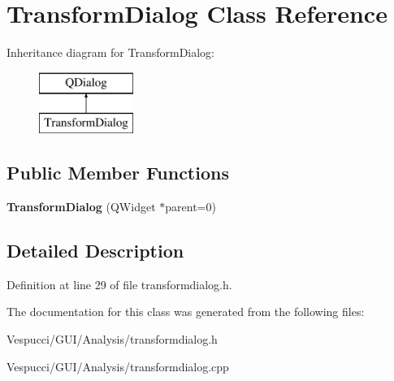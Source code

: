 \hypertarget{class_transform_dialog}{}\section{Transform\+Dialog Class Reference}
\label{class_transform_dialog}
Inheritance diagram for Transform\+Dialog\+:\begin{figure}[H]
\begin{center}
\leavevmode
\includegraphics[height=2.000000cm]{class_transform_dialog}
\end{center}
\end{figure}
\subsection*{Public Member Functions}
\begin{DoxyCompactItemize}
\item 
{\bfseries Transform\+Dialog} (Q\+Widget $\ast$parent=0)\hypertarget{class_transform_dialog_a56f845497971f9f8d21ff7aafbc53596}{}\label{class_transform_dialog_a56f845497971f9f8d21ff7aafbc53596}

\end{DoxyCompactItemize}


\subsection{Detailed Description}


Definition at line 29 of file transformdialog.\+h.



The documentation for this class was generated from the following files\+:\begin{DoxyCompactItemize}
\item 
Vespucci/\+G\+U\+I/\+Analysis/transformdialog.\+h\item 
Vespucci/\+G\+U\+I/\+Analysis/transformdialog.\+cpp\end{DoxyCompactItemize}
